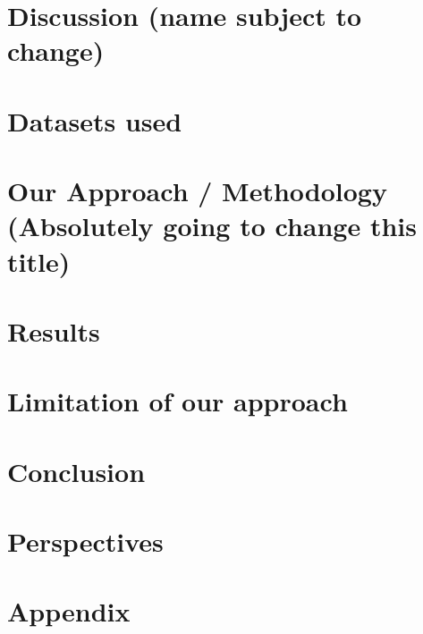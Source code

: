 \documentclass[oneside, a4paper, onecolumn, 11pt]{article}
\begin{document}
\section{Discussion (name subject to change)} %

\section{Datasets used}

\section{Our Approach / Methodology (Absolutely going to change this title)}

\section{Results}

\section{Limitation of our approach}

\section{Conclusion}

\section{Perspectives}

\newpage
\nocite{*}



\newpage
\appendix

\section{Appendix}
\label{sec:appendix}
\end{document}
